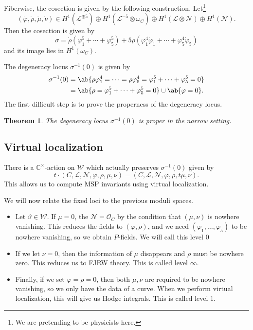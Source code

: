 \documentclass[10pt]{amsart}
\newtheorem{thm}{Theorem}[section]
\theoremstyle{definition}
\theoremstyle{remark}
\theoremstyle{plain}
\theoremstyle{definition}
\theoremstyle{remark}
\newcommand{\C}{\mathbb{C}}
\newcommand{\mc}[1]{\mathcal{#1}}
\newcommand{\1}{\mathbf{1}}
\newcommand{\2}{\mathbf{2}}
\newcommand{\3}{\mathbf{3}}
\begin{document}
Fiberwise, the cosection is given by the following construction. Let\footnote{We are pretending to be physicists here.}
\[ (\dot{\varphi}, \dot{\rho}, \dot{\mu}, \dot{\nu}) \in H^1(\mc{L}^{\oplus 5}) \oplus H^1(\mc{L}^{-5} \otimes \omega_C) \oplus H^1(\mc{L} \otimes \mc{N}) \oplus H^1(\mc{N}). \]
Then the cosection is given by
\[ \sigma = \dot{\rho}(\varphi_1^5 + \cdots + \varphi_5^5) + 5 \rho (\varphi_1^4 \dot{\varphi}_1 + \cdots + \varphi_5^4 \dot{\varphi}_5) \]
and its image lies in $H^1(\omega_C)$.

The degeneracy locus $\sigma^{-1}(0)$ is given by
\begin{align*}
    \sigma^{-1}(0) &= \ab\{ \rho \varphi_1^4 = \cdots = \rho \varphi_5^4 = \varphi_1^5 + \cdots + \varphi_5^5 = 0\} \\
    &= \ab\{ \rho = \varphi_1^5 + \cdots + \varphi_5^5 = 0\} \cup \ab\{ \varphi = 0 \}.
\end{align*}
The first difficult step is to prove the properness of the degeneracy locus.

\begin{thm}
    The degeneracy locus $\sigma^{-1}(0)$ is proper in the narrow setting.
\end{thm}

\subsection{Virtual localization}%
\label{sub:Torus action}

There is a $\C^{\times}$-action on $\mc{W}$ which actually preserves $\sigma^{-1}(0)$ given by
\[ t \cdot (C, \mc{L},\mc{N},\varphi,\rho,\mu,\nu) = (C, \mc{L},\mc{N},\varphi, \rho,t\mu,\nu). \]
This allows us to compute MSP invariants using virtual localization.

We will now relate the fixed loci to the previous moduli spaces.

\begin{itemize}
    \item Let $\vartheta \in \mc{W}$. If $\mu = 0$, the $\mc{N} = \mc{O}_C$ by the condition that $(\mu,\nu)$ is nowhere vanishing. This reduces the fields to $(\varphi, \rho)$, and we need $(\varphi_1, \ldots, \varphi_5)$ to be nowhere vanishing, so we obtain $P$-fields. We will call this level $0$
    \item If we let $\nu = 0$, then the information of $\mu$ disappears and $\rho$ must be nowhere zero. This reduces us to FJRW theory. This is called level $\infty$.
    \item Finally, if we set $\varphi = \rho = 0$, then both $\mu, \nu$ are required to be nowhere vanishing, so we only have the data of a curve. When we perform virtual localization, this will give us Hodge integrals. This is called level $1$.
\end{itemize}
\end{document}
